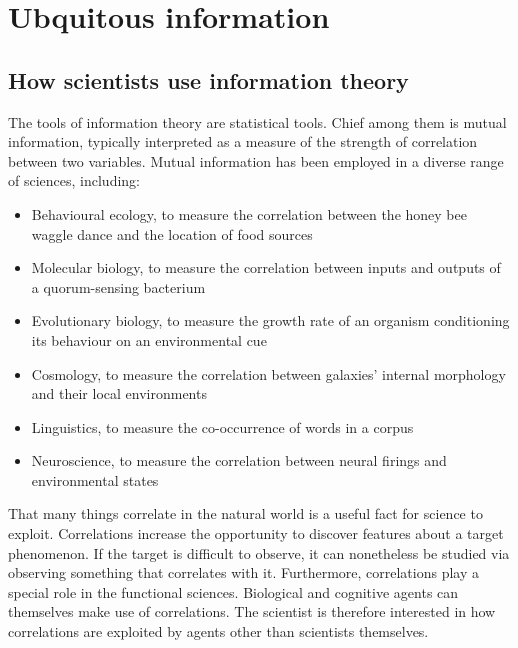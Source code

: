 \section{Ubquitous information}\label{sec:ubiquitous}

\subsection{How scientists use information theory}\label{subsec:scientists}

The tools of information theory are statistical tools.
Chief among them is mutual information, typically interpreted as a measure of the strength of correlation between two variables.
Mutual information has been employed in a diverse range of sciences, including:

\begin{itemize}
    \item Behavioural ecology, to measure the correlation between the honey bee waggle dance and the location of food sources \citep{haldane1954statistical}
    \item Molecular biology, to measure the correlation between inputs and outputs of a quorum-sensing bacterium \citep{mehta2009information}
    \item Evolutionary biology, to measure the growth rate of an organism conditioning its behaviour on an environmental cue \citep{donaldson-matasci2010fitness}
    \item Cosmology, to measure the correlation between galaxies' internal morphology and their local environments \citep{pandey2017how}
    \item Linguistics, to measure the co-occurrence of words in a corpus \citep[$\S$4]{hunston2002corpora}
    \item Neuroscience, to measure the correlation between neural firings and environmental states \citep[][and references therein]{rathkopf2017neural}
\end{itemize}

\noindent That many things correlate in the natural world is a useful fact for science to exploit.
Correlations increase the opportunity to discover features about a target phenomenon.
If the target is difficult to observe, it can nonetheless be studied via observing something that correlates with it. 
Furthermore, correlations play a special role in the functional sciences.
Biological and cognitive agents can themselves make use of correlations.
The scientist is therefore interested in how correlations are exploited by agents other than scientists themselves.

